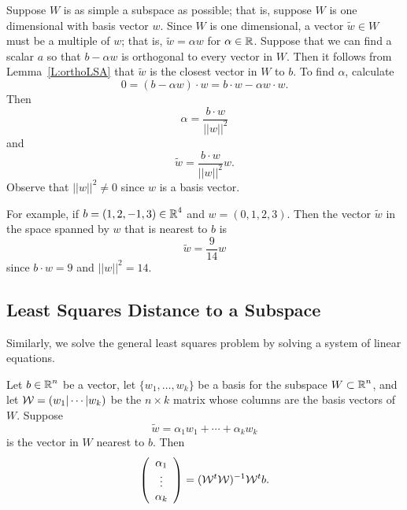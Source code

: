 \documentclass{ximera}
\begin{document}
Suppose $W$ is as simple a subspace as possible; that is, suppose $W$ is one
dimensional with basis vector $w$.  Since $W$ is one dimensional, a vector
$\tilde{w}\in W$ must be a multiple of $w$; that is,
$\tilde{w} = \alpha w$ for $\alpha\in\mbox{$\mathbb{R}$}$.  Suppose that we can find a scalar $a$ 
so that $b - \alpha w$ is orthogonal to every vector in $W$.  Then it follows from
Lemma~\ref{L:orthoLSA} that $\tilde{w}$ is the closest vector in $W$ to $b$.
To find $\alpha$, calculate
\[
0 = (b- \alpha w)\cdot w = b\cdot w - \alpha w\cdot w.
\]
Then
\[
\alpha = \frac{b\cdot w}{||w||^2}
\]
and
\begin{equation}  \label{E:singleortho}
\tilde{w} = \frac{b\cdot w}{||w||^2} w.
\end{equation}
Observe that $||w||^2\not=0$ since $w$ is a basis vector.

For example, if $b = (1,2,-1,3)\in\mbox{$\mathbb{R}$}^4$ and $w=(0,1,2,3)$.  Then the vector
$\tilde{w}$ in the space spanned by $w$ that is nearest to $b$ is
\[
\tilde{w} = \frac{9}{14}w
\]
since $b \cdot w = 9$ and $||w||^2 = 14$.

\subsection*{Least Squares Distance to a Subspace}

Similarly, we solve the general least squares problem by solving a 
system of linear equations.


\begin{theorem}  \label{T:nearestvector}
Let $b\in\mbox{$\mathbb{R}$}^n$ be a vector, let $\{w_1,\ldots,w_k\}$ be a basis 
for the subspace $W\subset\mbox{$\mathbb{R}$}^n$, and let $\mathcal{W} = (w_1|\cdots|w_k)$ 
be the $n\times k$ matrix whose columns are the basis vectors of $W$.  Suppose
\begin{equation} \label{e:w_0_in_basis}
\tilde{w} = \alpha_1w_1 + \cdots + \alpha_kw_k
\end{equation}
is the vector in $W$ nearest to $b$. Then
\begin{equation}  \label{E:nearestvector}
\left(\begin{array}{c} \alpha_1 \\ \vdots \\ \alpha_k \end{array}\right) =
(\mathcal{W}^t\mathcal{W})^{-1} \mathcal{W}^t b.
\end{equation}
\end{theorem}
\end{document}
